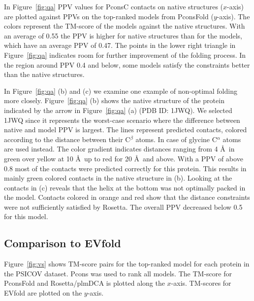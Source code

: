 \documentclass{bioinfo}
\begin{document}
In Figure~\ref{fig:qa} PPV values for PconsC contacts on native
structures ($x$-axis) are plotted against PPVs on the top-ranked
models from PconsFold ($y$-axis). The colors represent the TM-score of
the models against the native structures. With an average of 0.55 the
PPV is higher for native structures than for the models, which have an
average PPV of 0.47. The points in the lower right
triangle in Figure~\ref{fig:qa} indicates room for further improvement
of the folding process. In the region around PPV 0.4 and below,
some models satisfy the constraints better than the native
structures. 


In Figure~\ref{fig:qa} (b) and (c) we examine one example of
non-optimal folding more closely. Figure~\ref{fig:qa} (b) shows the
native structure of the protein indicated by the arrow in Figure~\ref{fig:qa} (a) (PDB ID: 1JWQ). We selected 1JWQ since it represents the worst-case scenario where the difference between native and model PPV is largest. The lines represent predicted contacts, colored according to the distance between their C$^{\beta}$ atoms. In case of glycine C$^{\alpha}$ atoms are used instead. The color gradient indicates distances ranging from 4 \AA\ in green over yellow at 10 \AA\ up to red for 20 \AA\ and above. With a PPV of above 0.8 most of the contacts were predicted correctly for this protein. This results in mainly green colored contacts in the native structure in (b). Looking at the contacts in (c) reveals that the helix at the bottom was not optimally packed in the model. Contacts colored in orange and red show that the distance constraints were not sufficiently satisfied by Rosetta. The overall PPV decreased below 0.5 for this model.







\subsection{Comparison to EVfold}

Figure~\ref{fig:vs} shows TM-score pairs for the top-ranked model for each protein in the PSICOV dataset. Pcons was used to rank all models. The TM-score for PconsFold  and Rosetta/plmDCA  is plotted along the $x$-axis. TM-scores for EVfold are plotted on the $y$-axis. 
\end{document}

